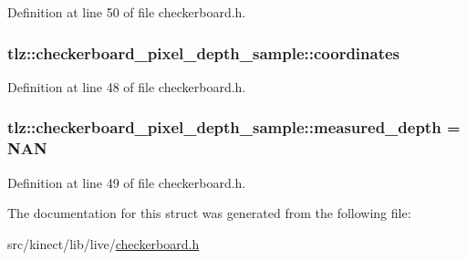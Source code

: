 Definition at line 50 of file checkerboard.\+h.

\subsubsection[{\texorpdfstring{coordinates}{coordinates}}]{ tlz\+::checkerboard\+\_\+pixel\+\_\+depth\+\_\+sample\+::coordinates}\hypertarget{structtlz_1_1checkerboard__pixel__depth__sample_ae75dff6faf6e8813249ebeebd43c51f1}{}\label{structtlz_1_1checkerboard__pixel__depth__sample_ae75dff6faf6e8813249ebeebd43c51f1}


Definition at line 48 of file checkerboard.\+h.

\subsubsection[{\texorpdfstring{measured\+\_\+depth}{measured_depth}}]{ tlz\+::checkerboard\+\_\+pixel\+\_\+depth\+\_\+sample\+::measured\+\_\+depth = N\+AN}\hypertarget{structtlz_1_1checkerboard__pixel__depth__sample_ae245311103eb6c20f302098943c8c9c5}{}\label{structtlz_1_1checkerboard__pixel__depth__sample_ae245311103eb6c20f302098943c8c9c5}


Definition at line 49 of file checkerboard.\+h.



The documentation for this struct was generated from the following file\+:\begin{DoxyCompactItemize}
\item 
src/kinect/lib/live/\hyperlink{checkerboard_8h}{checkerboard.\+h}\end{DoxyCompactItemize}
